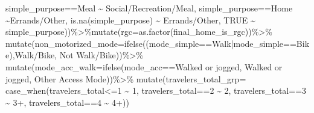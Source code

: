 \documentclass[
  12pt,
]{article}
\newenvironment{Shaded}{\begin{snugshade}}{\end{snugshade}}
\newcommand{\AttributeTok}[1]{\textcolor[rgb]{0.77,0.63,0.00}{#1}}
\newcommand{\ConstantTok}[1]{\textcolor[rgb]{0.00,0.00,0.00}{#1}}
\newcommand{\DecValTok}[1]{\textcolor[rgb]{0.00,0.00,0.81}{#1}}
\newcommand{\FunctionTok}[1]{\textcolor[rgb]{0.00,0.00,0.00}{#1}}
\newcommand{\NormalTok}[1]{#1}
\newcommand{\SpecialCharTok}[1]{\textcolor[rgb]{0.00,0.00,0.00}{#1}}
\newcommand{\StringTok}[1]{\textcolor[rgb]{0.31,0.60,0.02}{#1}}
\begin{document}
\begin{Shaded}
\begin{Highlighting}[]
\NormalTok{                                  simple\_purpose}\SpecialCharTok{==}\StringTok{\textquotesingle{}Meal\textquotesingle{}} \SpecialCharTok{\textasciitilde{}} \StringTok{\textquotesingle{}Social/Recreation/Meal\textquotesingle{}}\NormalTok{,}
\NormalTok{                                  simple\_purpose}\SpecialCharTok{==}\StringTok{\textquotesingle{}Home\textquotesingle{}} \SpecialCharTok{\textasciitilde{}}\StringTok{\textquotesingle{}Errands/Other\textquotesingle{}}\NormalTok{,}
                                  \FunctionTok{is.na}\NormalTok{(simple\_purpose) }\SpecialCharTok{\textasciitilde{}} \StringTok{\textquotesingle{}Errands/Other\textquotesingle{}}\NormalTok{,}
                                  \ConstantTok{TRUE} \SpecialCharTok{\textasciitilde{}}\NormalTok{ simple\_purpose))}\SpecialCharTok{\%\textgreater{}\%}\FunctionTok{mutate}\NormalTok{(}\AttributeTok{rgc=}\FunctionTok{as.factor}\NormalTok{(final\_home\_is\_rgc))}\SpecialCharTok{\%\textgreater{}\%}
  \FunctionTok{mutate}\NormalTok{(}\AttributeTok{non\_motorized\_mode=}\FunctionTok{ifelse}\NormalTok{((mode\_simple}\SpecialCharTok{==}\StringTok{\textquotesingle{}Walk\textquotesingle{}}\SpecialCharTok{|}\NormalTok{mode\_simple}\SpecialCharTok{==}\StringTok{\textquotesingle{}Bike\textquotesingle{}}\NormalTok{),}\StringTok{\textquotesingle{}Walk/Bike\textquotesingle{}}\NormalTok{, }\StringTok{\textquotesingle{}Not Walk/Bike\textquotesingle{}}\NormalTok{))}\SpecialCharTok{\%\textgreater{}\%}
  \FunctionTok{mutate}\NormalTok{(}\AttributeTok{mode\_acc\_walk=}\FunctionTok{ifelse}\NormalTok{(mode\_acc}\SpecialCharTok{==}\StringTok{\textquotesingle{}Walked or jogged\textquotesingle{}}\NormalTok{, }\StringTok{\textquotesingle{}Walked or jogged\textquotesingle{}}\NormalTok{, }\StringTok{\textquotesingle{}Other Access Mode\textquotesingle{}}\NormalTok{))}\SpecialCharTok{\%\textgreater{}\%}
  \FunctionTok{mutate}\NormalTok{(}\AttributeTok{travelers\_total\_grp=} \FunctionTok{case\_when}\NormalTok{(travelers\_total}\SpecialCharTok{\textless{}=}\DecValTok{1} \SpecialCharTok{\textasciitilde{}} \StringTok{\textquotesingle{}1\textquotesingle{}}\NormalTok{,}
\NormalTok{                                        travelers\_total}\SpecialCharTok{==}\DecValTok{2} \SpecialCharTok{\textasciitilde{}} \StringTok{\textquotesingle{}2\textquotesingle{}}\NormalTok{,}
\NormalTok{                                        travelers\_total}\SpecialCharTok{==}\DecValTok{3} \SpecialCharTok{\textasciitilde{}} \StringTok{\textquotesingle{}3+\textquotesingle{}}\NormalTok{,}
\NormalTok{                                        travelers\_total}\SpecialCharTok{==}\DecValTok{4} \SpecialCharTok{\textasciitilde{}} \StringTok{\textquotesingle{}4+\textquotesingle{}}\NormalTok{))}


\end{Highlighting}
\end{Shaded}
\end{document}
